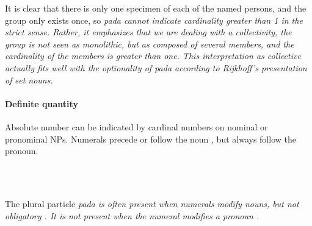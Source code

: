 It is clear that there is only one specimen of each of the named persons, and the group only exists once, so \em pada \em cannot indicate cardinality greater than 1 in the strict sense. Rather, it emphasizes that we are dealing with a collectivity, the group is not seen as monolithic, but as composed of several members, and the cardinality of the members is greater than one. This interpretation as collective actually fits well with the optionality of \em pada \em according to Rijkhoff's presentation of \em set nouns\em.\kuckn

\paragraph{Definite quantity}\label{sec:func:mod:DefiniteQuantity}
Absolute number can be indicated by cardinal numbers on nominal or pronominal NPs. Numerals precede or follow the noun , but always follow the pronoun.

\\

\\




The plural particle \em pada \em is often present when numerals modify nouns, but not obligatory . It is not present when the numeral modifies a pronoun .


